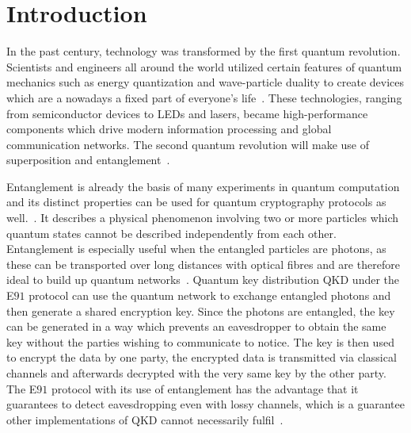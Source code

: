 \chapter{Introduction}

In the past century, technology was transformed by the first quantum revolution. Scientists and engineers all around the world utilized certain features of quantum mechanics such as energy quantization and wave-particle duality to create devices which are a nowadays a fixed part of everyone's life~\cite{aharonovich_solid-state_2016}.
These technologies, ranging from semiconductor devices to LEDs and lasers, became high-performance components which drive modern information processing and global communication networks.
The second quantum revolution will make use of superposition and entanglement~\cite{macfarlane_quantum_2003}.

Entanglement is already the basis of many experiments in quantum computation and its distinct properties can be used for quantum cryptography protocols as well.~\cite{zeilinger_light_2017}.
It describes a physical phenomenon involving two or more particles which quantum states cannot be described independently from each other.
Entanglement is especially useful when the entangled particles are photons, as these can be transported over long distances with optical fibres and are therefore ideal to build up quantum networks~\cite{gisin_quantum_2002}.
Quantum key distribution \acs{QKD}  under the E$91$ protocol can use the quantum network to exchange entangled photons and then generate a shared encryption key.
Since the photons are entangled, the key can be generated in a way which prevents an eavesdropper to obtain the same key without the parties wishing to communicate to notice.
The key is then used to encrypt the data by one party, the encrypted data is transmitted via classical channels and afterwards decrypted with the very same key by the other party.
The E$91$ protocol with its use of entanglement has the advantage that it guarantees to detect eavesdropping even with lossy channels, which is a guarantee other implementations of \ac{QKD} cannot necessarily fulfil~\cite{ekert_quantum_1991}.

